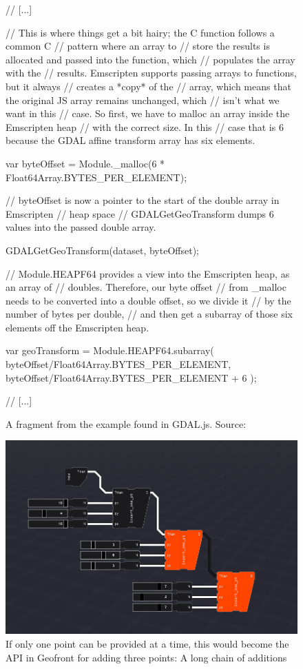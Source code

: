 \begin{figure}
  \graphicspath{{../../assets/images/6.1.2/}}
  \centering
  \begin{code}
  // [...]
  
  // This is where things get a bit hairy; the C function follows a common C
  // pattern where an array to
  // store the results is allocated and passed into the function, which 
  // populates the array with the
  // results. Emscripten supports passing arrays to functions, but it always 
  // creates a *copy* of the
  // array, which means that the original JS array remains unchanged, which 
  // isn't what we want in this
  // case. So first, we have to malloc an array inside the Emscripten heap  
  // with the correct size. In this
  // case that is 6 because the GDAL affine transform array has six elements.

  var byteOffset = Module._malloc(6 * Float64Array.BYTES_PER_ELEMENT);
  
  // byteOffset is now a pointer to the start of the double array in Emscripten 
  // heap space
  // GDALGetGeoTransform dumps 6 values into the passed double array.
  
  GDALGetGeoTransform(dataset, byteOffset);
  
  // Module.HEAPF64 provides a view into the Emscripten heap, as an array of 
  // doubles. Therefore, our byte offset
  // from _malloc needs to be converted into a double offset, so we divide it 
  // by the number of bytes per double,
  // and then get a subarray of those six elements off the Emscripten heap.
  
  var geoTransform = Module.HEAPF64.subarray(
      byteOffset/Float64Array.BYTES_PER_ELEMENT,
      byteOffset/Float64Array.BYTES_PER_ELEMENT + 6
  );
  
  // [...]
  \end{code}
  
  \caption[]{A fragment from the  example found in GDAL.js. Source: \citet{dohler_gdal_2022}}
  \label{fig:gdaljs_ugly}
\end{figure}

\begin{figure}
  \graphicspath{{../../assets/images/6.1.2/}}
  \centering
  \includegraphics[width=0.50\linewidth]{chain-API.PNG}
  \caption[]{If only one point can be provided at a time, this would become the API in Geofront for adding three points: A long chain of additions}
  \label{fig:chain-api}
\end{figure}


